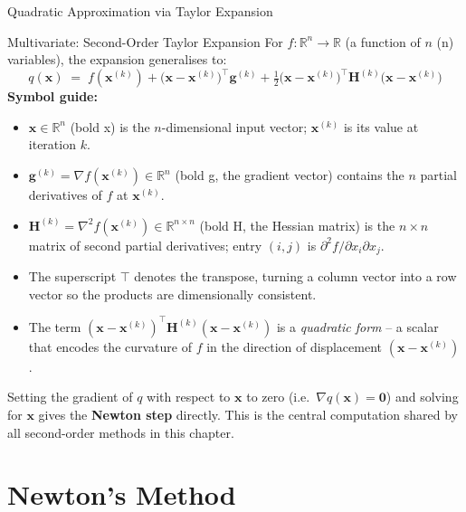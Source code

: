 \documentclass[aspectratio=169,10pt]{beamer}
\newcommand{\xbf}{\mathbf{x}}
\newcommand{\gbf}{\mathbf{g}}
\newcommand{\Hbf}{\mathbf{H}}
\begin{document}
\begin{frame}[allowframebreaks]{Quadratic Approximation via Taylor Expansion}
  \framebreak

  \begin{block}{Multivariate: Second-Order Taylor Expansion}
    For $f : \mathbb{R}^n \to \mathbb{R}$ (a function of $n$ (n) variables), the
    expansion generalises to:
    \[
      q(\xbf) \;=\; f\!\left(\xbf^{(k)}\right)
               + \bigl(\xbf - \xbf^{(k)}\bigr)^\top \gbf^{(k)}
               + \tfrac{1}{2}\bigl(\xbf - \xbf^{(k)}\bigr)^\top
                 \Hbf^{(k)}\bigl(\xbf - \xbf^{(k)}\bigr)
    \]
    \textbf{Symbol guide:}
    \begin{itemize}
      \item $\xbf \in \mathbb{R}^n$ (bold x) is the $n$-dimensional input vector;
        $\xbf^{(k)}$ is its value at iteration $k$.
      \item $\gbf^{(k)} = \nabla f(\xbf^{(k)}) \in \mathbb{R}^n$ (bold g, the
        gradient vector) contains the $n$ partial derivatives of $f$ at
        $\xbf^{(k)}$.
      \item $\Hbf^{(k)} = \nabla^2 f(\xbf^{(k)}) \in \mathbb{R}^{n \times n}$
        (bold H, the Hessian matrix) is the $n \times n$ matrix of second partial
        derivatives; entry $(i,j)$ is $\partial^2 f / \partial x_i \partial x_j$.
      \item The superscript $\top$ denotes the transpose, turning a column vector
        into a row vector so the products are dimensionally consistent.
      \item The term $(\xbf - \xbf^{(k)})^\top \Hbf^{(k)} (\xbf - \xbf^{(k)})$
        is a \emph{quadratic form} -- a scalar that encodes the curvature of $f$
        in the direction of displacement $(\xbf - \xbf^{(k)})$.
    \end{itemize}
  \end{block}

  Setting the gradient of $q$ with respect to $\xbf$ to zero (i.e.\ $\nabla q(\xbf)
  = \mathbf{0}$) and solving for $\xbf$ gives the \textbf{Newton step} directly.
  This is the central computation shared by all second-order methods in this chapter.

\end{frame}

\section{Newton's Method}
\end{document}
